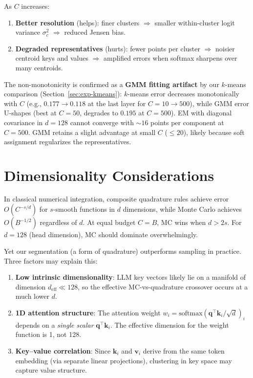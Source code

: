 \documentclass[11pt,a4paper]{article}
\theoremstyle{definition}
\newcommand{\vv}{\mathbf{v}}
\newcommand{\kk}{\mathbf{k}}
\newcommand{\qq}{\mathbf{q}}
\newcommand{\softmax}{\mathrm{softmax}}
\begin{document}
As $C$ increases:
\begin{enumerate}[nosep]
  \item \textbf{Better resolution} (helps): finer clusters $\Rightarrow$
    smaller within-cluster logit variance $\sigma_c^2$
    $\Rightarrow$ reduced Jensen bias.
  \item \textbf{Degraded representatives} (hurts): fewer points per cluster
    $\Rightarrow$ noisier centroid keys and values $\Rightarrow$ amplified
    errors when softmax sharpens over many centroids.
\end{enumerate}

\begin{researchnote}
The non-monotonicity is confirmed as a \textbf{GMM fitting artifact} by our
$k$-means comparison (Section~\ref{sec:exp-kmeans}):
$k$-means error decreases monotonically with $C$ (e.g., $0.177 \to 0.118$ at
the last layer for $C = 10 \to 500$), while GMM error U-shapes
(best at $C=50$, degrades to $0.195$ at $C=500$).
EM with diagonal covariance in $d=128$ cannot converge with $\sim 16$ points
per component at $C=500$.  GMM retains a slight advantage at small $C$
($\le 20$), likely because soft assignment regularizes the representatives.
\end{researchnote}


\section{Dimensionality Considerations}\label{sec:dimension}

In classical numerical integration, composite quadrature rules achieve error
$O(C^{-s/d})$ for $s$-smooth functions in $d$ dimensions, while Monte Carlo
achieves $O(B^{-1/2})$ regardless of $d$.  At equal budget $C=B$, MC wins
when $d>2s$.  For $d=128$ (head dimension), MC should dominate overwhelmingly.

Yet our segmentation (a form of quadrature) outperforms sampling in practice.
Three factors may explain this:

\begin{enumerate}[nosep]
  \item \textbf{Low intrinsic dimensionality}: LLM key vectors likely lie on a
    manifold of dimension $d_{\mathrm{eff}}\ll 128$, so the effective MC-vs-quadrature crossover occurs at a much lower $d$.

  \item \textbf{1D attention structure}: The attention weight
    $w_i = \softmax(\qq^{\!\top}\kk_i/\sqrt{d})_i$ depends on a
    \emph{single scalar} $\qq^{\!\top}\kk_i$.  The effective dimension for
    the weight function is 1, not 128.

  \item \textbf{Key--value correlation}: Since $\kk_i$ and $\vv_i$ derive from
    the same token embedding (via separate linear projections), clustering in
    key space may capture value structure.
\end{enumerate}
\end{document}
